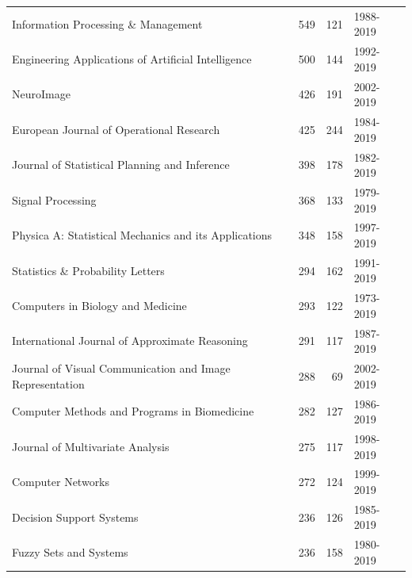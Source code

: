 \documentclass[12pt]{article}
\begin{document}
\begin{center}
{\begin{longtable}{lrrl}
			Information Processing \& Management                                                 &       549 &      121 & 1988-2019 \\
			Engineering Applications of Artificial Intelligence                                  &       500 &      144 & 1992-2019 \\
			NeuroImage                                                                           &       426 &      191 & 2002-2019 \\
			European Journal of Operational Research                                             &       425 &      244 & 1984-2019 \\
			Journal of Statistical Planning and Inference                                        &       398 &      178 & 1982-2019 \\
			Signal Processing                                                                    &       368 &      133 & 1979-2019 \\
			Physica A: Statistical Mechanics and its Applications                                &       348 &      158 & 1997-2019 \\
			Statistics \& Probability Letters                                                    &       294 &      162 & 1991-2019 \\
			Computers in Biology and Medicine                                                    &       293 &      122 & 1973-2019 \\
			International Journal of Approximate Reasoning                                       &       291 &      117 & 1987-2019 \\
			Journal of Visual Communication and Image Representation                             &       288 &       69 & 2002-2019 \\
			Computer Methods and Programs in Biomedicine                                         &       282 &      127 & 1986-2019 \\
			Journal of Multivariate Analysis                                                     &       275 &      117 & 1998-2019 \\
			Computer Networks                                                                    &       272 &      124 & 1999-2019 \\
			Decision Support Systems                                                             &       236 &      126 & 1985-2019 \\
			Fuzzy Sets and Systems                                                               &       236 &      158 & 1980-2019 \\

\end{longtable}}
\end{center}
\end{document}
